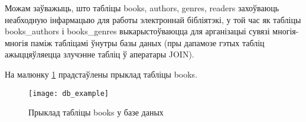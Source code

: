 Можам заўважыць, што табліцы books, authors, genres, readers захоўваюць неабходную інфармацыю для
работы электроннай бібліятэкі, у той час як табліцы books\_authors і books\_genres выкарыстоўваюцца
для арганізацыі сувязі многія-многія паміж табліцамі ўнутры базы даных (пры дапамозе гэтых табліц
ажыццяўляецца злучэнне табліц ў аператары JOIN).

На малюнку \ref{img: DB example} прадстаўлены прыклад табліцы books.

\begin{figure}[h!]
    \centering
    \texttt{[image: db\_example]}
    \caption{Прыклад табліцы books у базе даных}
    \label{img: DB example} 
\end{figure}
